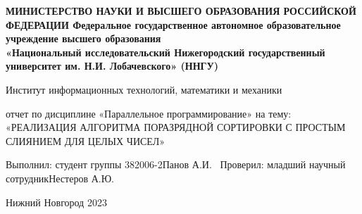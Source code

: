 \documentclass[12pt,a4paper]{article}
\title{}
\author{}
\date{}
\begin{document}
\begin{titlepage}
    \newpage
    \begin{center}
    {\bfseries МИНИСТЕРСТВО НАУКИ И ВЫСШЕГО ОБРАЗОВАНИЯ РОССИЙСКОЙ ФЕДЕРАЦИИ
Федеральное государственное автономное образовательное учреждение
высшего образования
 \\
    «Национальный исследовательский
Нижегородский государственный университет им. Н.И. Лобачевского»
(ННГУ)
}

     Институт информационных технологий, математики и механики \\
    \end{center}

    \vspace{1.2em}

    \begin{center}
    \Large отчет \linebreak по дисциплине «Параллельное программирование» \linebreak на тему: \linebreak
«РЕАЛИЗАЦИЯ АЛГОРИТМА ПОРАЗРЯДНОЙ СОРТИРОВКИ С ПРОСТЫМ СЛИЯНИЕМ ДЛЯ ЦЕЛЫХ ЧИСЕЛ»

    \end{center}

    \vspace{5em}


    \begin{flushright}
                       Выполнил:
                       студент группы 382006-2\linebreak Панов А.И.\underline{\hspace{3cm}} \linebreak\  Проверил: младший научный сотрудник\linebreak Нестеров А.Ю.\underline{\hspace{3cm}} 
    \end{flushright}


    \vspace{\fill}

    \begin{center}
    Нижний Новгород 2023
    \end{center}

    \end{titlepage}
    
\maketitle
\end{document}
